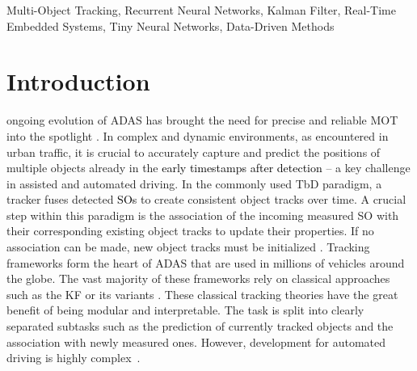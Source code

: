 \documentclass[letterpaper, 10 pt, journal, twoside]{IEEEtran}
\newcommand{\red}[1]{\textcolor{black}{#1}}
\begin{document}
\renewcommand{\IEEEkeywordsname}{Keywords}
\begin{IEEEkeywords}
\normalfont Multi-Object Tracking, Recurrent Neural Networks, Kalman Filter, Real-Time Embedded Systems, Tiny Neural Networks, Data-Driven Methods
\end{IEEEkeywords}

\section{Introduction}
ongoing evolution of \ac{ADAS} has brought the need for precise and reliable \ac{MOT} into the spotlight {\cite{KF_Bewley.2016,KF_simple_cues.2022,KF_BoundingBD.2023, DL_RNN_mot.2016,DL_RNN_data_association.2019,DL_CNN_ATT_mot.2017,DL_ATT_Trackformer.2022, DL_ATT_CNN_soda.2020, Zhang2021ByteTrackMT,Zhang2020FairMOTOT, liu2020deepmtt}}.
In complex and dynamic environments, as encountered in urban traffic, it is crucial to accurately capture and predict the positions of multiple objects already in the \red{early timestamps after detection} -- a key challenge in assisted and automated driving.
In the commonly used \ac{TbD} paradigm, a tracker fuses detected \red{\acp{SO}} to create consistent object tracks over time.
A crucial step within this paradigm is the association of the incoming measured \ac{SO} with their corresponding existing object tracks to update their properties.
If no association can be made, new object tracks must be initialized {\cite{KF_Bewley.2016,KF_simple_cues.2022,KF_BoundingBD.2023,OD_kampker.2018,OD_wu.2022}}.
Tracking frameworks form the heart of ADAS that are used in millions of vehicles around the globe.
The vast majority of these frameworks rely on classical approaches such as the \ac{KF} or its variants {\cite{KF_Bewley.2016,KF_simple_cues.2022,KF_BoundingBD.2023}}.
These classical tracking theories have the great benefit of being modular and interpretable.
The task is split into clearly separated subtasks such as the prediction of currently tracked objects and the association with newly measured ones.
However, development for automated driving is highly complex~{\cite{AD_Overview.2017,AD_book.2024}}.
\end{document}
